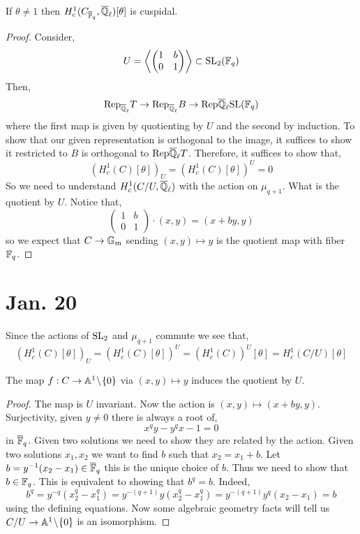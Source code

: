 \documentclass[12pt]{article}
\begin{document}
\begin{theorem}
If $\theta \neq 1$ then $H^1_c(C_{\overline{\mathbb{F}}_q}, \overline{\mathbb{Q}}_\ell)[\theta]$ is cuspidal. 
\end{theorem}

\begin{proof}
Consider,
\[ U = \left< 
\begin{pmatrix}
1 & b
\\
0 & 1 
\end{pmatrix} \right> \subset \mathrm{SL}_2(\mathbb{F}_q) \]
Then,
\[ \mathrm{Rep}_{\overline{\mathbb{Q}}_\ell}{T} \to \mathrm{Rep}_{\overline{\mathbb{Q}}_\ell}{B} \to \mathrm{Rep}{\overline{\mathbb{Q}}_\ell}{\mathrm{SL}(\mathbb{F}_q)} \]
where the first map is given by quotienting by $U$ and the second by induction. To show that our given representation is orthogonal to the image, it suffices to show it restricted to $B$ is orthogonal to $\mathrm{Rep}{\overline{\mathbb{Q}}_\ell}{T}$. Therefore, it suffices to show that,
\[ (H^1_c(C)[\theta])_U = (H^1_c(C)[\theta])^U = 0 \]
So we need to understand $H^1_c(C/U, \overline{\mathbb{Q}}_\ell)$ with the action on $\mu_{q+1}$. What is the quotient by $U$. Notice that,
\[ \begin{pmatrix}
1 & b 
\\
0 & 1 
\end{pmatrix} \cdot (x, y) = (x + b y, y) \]
so we expect that $C \to {\mathbb{G}_m}$ sending $(x,y) \mapsto y$ is the quotient map with fiber $\mathbb{F}_q$.
\end{proof}

\section{Jan. 20}

Since the actions of $\mathrm{SL}_2$ and $\mu_{q+1}$ commute we see that,
\[ ( H^1_c(C)[\theta])_U = (H^1_c(C)[\theta])^U = (H^1_c(C))^U[\theta] = H^1_c(C/U)[\theta] \]

\begin{lemma}
The map $f : C \to \mathbb{A}^1 \! \setminus \! \{ 0 \}$ via $(x,y) \mapsto y$ induces the quotient by $U$. 
\end{lemma}

\begin{proof}
The map is $U$ invariant. Now the action is $(x, y) \mapsto (x + by, y)$. Surjectivity, given $y \neq 0$ there is always a root of,
\[ x^q y - y^q x - 1 = 0 \]
in $\overline{\mathbb{F}}_q$. Given two solutions we need to show they are related by the action. Given two solutions $x_1, x_2$ we want to find $b$ such that $x_2 = x_1 + b$. Let $b = y^{-1}(x_2 - x_1) \in \overline{\mathbb{F}}_q$ this is the unique choice of $b$. Thus we need to show that $b \in \mathbb{F}_q$. This is equivalent to showing that $b^q = b$. Indeed,
\[ b^q = y^{-q} (x_2^q - x_1^q) = y^{-(q+1)} y(x_2^q - x_1^q) = y^{-(q+1)} y^q (x_2 - x_1) = b \]
using the defining equations. Now some algebraic geometry facts will tell us $C/U \to \mathbb{A}^1 \! \setminus \! \{ 0 \}$ is an isomorphism. 
\end{proof}
\end{document}
